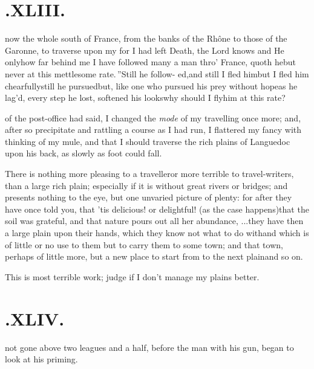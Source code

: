 \documentclass{article}
\begin{document}
\section{.\enspace XLIII.}

 now the whole south of
France, from the banks of the Rhône to those of
the Garonne, to traverse upon my \break
\tsh for I had left Death, the Lord knows\break
\tsh and He only\tsk how far behind me\break
\tsh \lqq I have followed many a man thro’
France, quoth he\tsk but never at this\break
mettlesome rate.\,”\tsh Still he follow-\break
ed,\tsh and still I fled him\tsh but I fled him
chearfully\tsh still he pursued\tsh but, like one
who pursued his prey without hope\tsh as he lag’d,
every step he lost, softened his looks\tsh why should I
fly\break him at this rate?

\noindent
{}\break 
of the post-office had said, I changed the
\textit{mode} of my travelling once more; and,
after so precipitate and rattling a course as I had run, I
flattered my fancy with thinking of my mule, and that I should
traverse the rich plains of Languedoc upon his back, as
slowly as foot could fall.

There is nothing more pleasing to a traveller\tsh or
more terrible to travel-writers, than a large rich plain;
especi\-ally if it is without great rivers or bridges; and presents
nothing to the eye, but one unvaried picture of plenty: for after
they have once told you, that ’tis delicious! or delightful!
(as the case happens)\tsk that the soil was grateful, and that
nature pours out all her abundance, \etc .\@ .\@ .\@ they
have then a large plain upon their hands, which they know not
what to do with\tsk and which is of little or no use to them but
to carry them to some town; and that town, perhaps of little
more, but a new place to start from to the next plain\tsh and so
on.

\tsh This is most terrible work; judge if I don’t manage
my plains better.

\section{.\enspace XLIV.}

 not gone above two leagues and
a half, before the man with his gun, began to look at his
priming.
\end{document}
